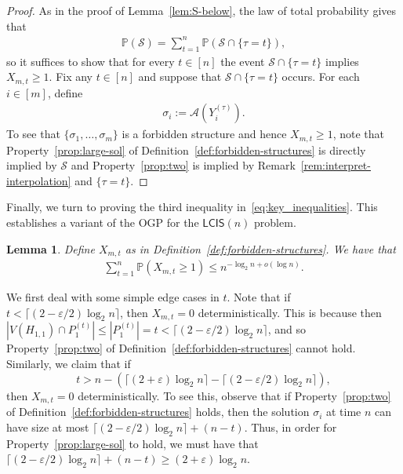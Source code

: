 \documentclass[11pt]{article}
\theoremstyle{plain}
\newtheorem{lemma}{Lemma}
\theoremstyle{definition}
\theoremstyle{remark}
\newcommand{\eps}{\varepsilon}
\newcommand{\MCS}{\mathsf{LCIS}}
\newcommand{\Alg}{\mathcal{A}}
\newcommand{\findManyLarge}{\mathcal{S}}
\renewcommand{\Pr}{\mathbb{P}}
\begin{document}
\begin{proof}
    As in the proof of Lemma~\ref{lem:S-below}, the law of total probability gives that
    \begin{align*}
        \Pr(\findManyLarge) = \sum_{t = 1}^n \Pr\left(\findManyLarge \cap \{\tau = t\}\right),
    \end{align*}
    so it suffices to show that for every $t \in [n]$ the event $\findManyLarge \cap \{\tau = t\}$ implies $X_{m,t} \geq 1$. Fix any $t \in [n]$ and suppose that $\findManyLarge \cap \{\tau = t\}$ occurs. For each $i \in [m]$, define
    \begin{align*}
        \sigma_i := \Alg(Y_i^{(\tau)}).
    \end{align*}
    To see that $\{\sigma_1, \dots, \sigma_m\}$ is a forbidden structure and hence $X_{m,t} \geq 1$, note that Property~\ref{prop:large-sol} of Definition~\ref{def:forbidden-structures} is directly implied by $\findManyLarge$ and Property~\ref{prop:two} is implied by Remark~\ref{rem:interpret-interpolation} and $\{\tau = t\}$.
\end{proof}

Finally, we turn to proving the third inequality in~\eqref{eq:key_inequalities}. This establishes a variant of the OGP for the $\MCS(n)$ problem. 

\begin{lemma}\label{lem:multi-OGP}
    Define $X_{m,t}$ as in Definition~\ref{def:forbidden-structures}. We have that 
    \begin{align*}
        \sum_{t = 1}^n \Pr(X_{m,t} \geq 1) \leq n^{-\log_2 n + o(\log n)}.
    \end{align*}
\end{lemma}

We first deal with some simple edge cases in $t$. 
Note that if $t < \lceil (2 - \eps/2) \log_2 n\rceil$, then $X_{m,t} = 0$ deterministically. This is because then 
$|V(H_{1,1}) \cap P_{1}^{(t)}| \leq |P_{1}^{(t)}| = t < \lceil (2 - \eps/2) \log_2 n\rceil$, 
and so Property~\ref{prop:two} of Definition~\ref{def:forbidden-structures} cannot hold. 
Similarly, we claim that if 
\[
t > n - \left( \lceil (2 + \eps) \log_2 n\rceil - \lceil (2 - \eps/2) \log_2 n\rceil \right),
\]
then $X_{m,t} = 0$ deterministically. 
To see this, observe that if Property~\ref{prop:two} of Definition~\ref{def:forbidden-structures} holds, 
then the solution $\sigma_{i}$ at time $n$ can have size at most 
$\lceil (2 - \eps/2) \log_2 n\rceil + (n-t)$. 
Thus, in order for Property~\ref{prop:large-sol} to hold, 
we must have that 
$\lceil (2 - \eps/2) \log_2 n\rceil + (n-t) 
\geq (2+\eps) \log_{2} n$. 
\end{document}
